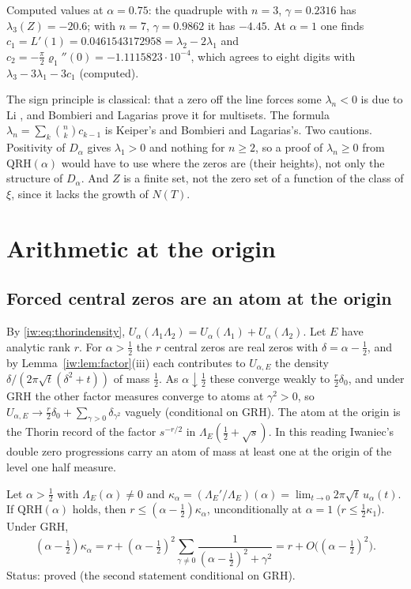 Computed values at $\alpha=0.75$: the quadruple with $n=3$, $\gamma=0.2316$ has $\lambda_3(Z)=-20.6$; with $n=7$, $\gamma=0.9862$ it has $-4.45$. At $\alpha=1$ one finds $c_1=L'(1)=0.0461543172958=\lambda_2-2\lambda_1$ and $c_2=-\frac\pi2\varrho_1''(0)=-1.1115823\cdot10^{-4}$, which agrees to eight digits with $\lambda_3-3\lambda_1-3c_1$ (computed).

The sign principle is classical: that a zero off the line forces some $\lambda_n<0$ is due to Li \cite{Li97}, and Bombieri and Lagarias \cite[Theorem~1]{BL99} prove it for multisets. The formula $\lambda_n=\sum_k\binom nk c_{k-1}$ is Keiper's \cite{Keiper92} and Bombieri and Lagarias's. Two cautions. Positivity of $D_\alpha$ gives $\lambda_1>0$ and nothing for $n\ge2$, so a proof of $\lambda_n\ge0$ from $\mathrm{QRH}(\alpha)$ would have to use where the zeros are (their heights), not only the structure of $D_\alpha$. And $Z$ is a finite set, not the zero set of a function of the class of $\xi$, since it lacks the growth of $N(T)$.
\section{Arithmetic at the origin}\label{iw:sec:origin}

\subsection{Forced central zeros are an atom at the origin}

By \eqref{iw:eq:thorindensity}, $U_\alpha(\Lambda_1\Lambda_2)=U_\alpha(\Lambda_1)+U_\alpha(\Lambda_2)$. Let $E$ have analytic rank $r$. For $\alpha>\frac12$ the $r$ central zeros are real zeros with $\delta=\alpha-\frac12$, and by Lemma~\ref{iw:lem:factor}(iii) each contributes to $U_{\alpha,E}$ the density $\delta/(2\pi\sqrt t(\delta^2+t))$ of mass $\frac12$. As $\alpha\downarrow\frac12$ these converge weakly to $\frac r2\delta_0$, and under GRH the other factor measures converge to atoms at $\gamma^2>0$, so $U_{\alpha,E}\to\frac r2\delta_0+\sum_{\gamma>0}\delta_{\gamma^2}$ vaguely (conditional on GRH). The atom at the origin is the Thorin record of the factor $s^{-r/2}$ in $\Lambda_E(\frac12+\sqrt s)$. In this reading Iwaniec's double zero progressions carry an atom of mass at least one at the origin of the level one half measure.

\begin{proposition}\label{iw:prop:rank}
Let $\alpha>\frac12$ with $\Lambda_E(\alpha)\ne0$ and $\kappa_\alpha=(\Lambda_E'/\Lambda_E)(\alpha)=\lim_{t\to0}2\pi\sqrt t\,u_\alpha(t)$. If $\mathrm{QRH}(\alpha)$ holds, then $r\le(\alpha-\frac12)\kappa_\alpha$, unconditionally at $\alpha=1$ ($r\le\frac12\kappa_1$). Under GRH,
\[
(\alpha-\tfrac12)\kappa_\alpha=r+(\alpha-\tfrac12)^2\sum_{\gamma\ne0}\frac1{(\alpha-\frac12)^2+\gamma^2}=r+O\big((\alpha-\tfrac12)^2\big).
\]
Status: proved (the second statement conditional on GRH).
\end{proposition}

